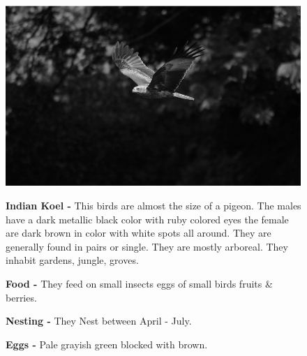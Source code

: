 \begin{figure}[H]
\begin{center}
\includegraphics{figure/Land_birds/01_pariah_kite/pariah-kite.eps}
\end{center}
\medskip
\noindent
{\bf Indian Koel -} This birds are almost the size of a pigeon. The males have a dark metallic black color with ruby colored eyes the female are dark brown in color with white spots all around. They are generally found in pairs or single. They are mostly arboreal. They inhabit gardens, jungle, groves.


\medskip
{\bf Food -} They feed on small insects eggs of small birds fruits \& berries. 

{\bf Nesting -} They Nest between April - July.

{\bf Eggs -} Pale grayish green blocked with brown.
\end{figure}

\vfill\eject

~\phantom{a}
\vfill

